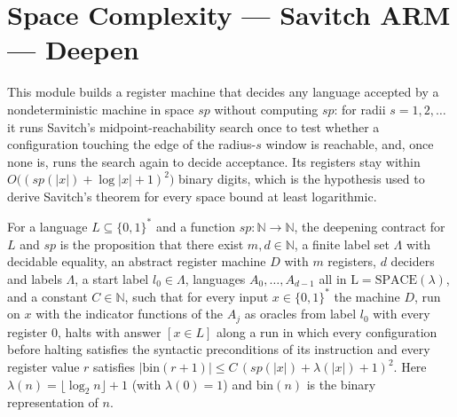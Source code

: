\section{Space Complexity --- Savitch ARM --- Deepen}
This module builds a register machine that decides any language accepted by a
nondeterministic machine in space $\mathit{sp}$ without computing $\mathit{sp}$: for radii
$s=1,2,\dots$ it runs Savitch's midpoint-reachability search once to test whether a configuration
touching the edge of the radius-$s$ window is reachable, and, once none is, runs the search again to
decide acceptance. Its registers stay within $O\bigl((\mathit{sp}(|x|)+\log|x|+1)^2\bigr)$ binary
digits, which is the hypothesis used to derive Savitch's theorem for every space bound at least
logarithmic.

\begin{definition}
\label{Complexity.LogProg.SavitchARM.DeepenContract}
\leanok
{}
For a language $L\subseteq\{0,1\}^*$ and a function $\mathit{sp}:\mathbb{N}\to\mathbb{N}$, the
deepening contract for $L$ and $\mathit{sp}$ is the proposition that there exist $m,d\in\mathbb{N}$,
a finite label set $\Lambda$ with decidable equality, an abstract register machine $D$ with $m$
registers, $d$ deciders and labels $\Lambda$, a start label $l_0\in\Lambda$, languages
$A_0,\dots,A_{d-1}$ all in $\mathrm{L}=\mathrm{SPACE}(\lambda)$, and a constant $C\in\mathbb{N}$, such that
for every input $x\in\{0,1\}^*$ the machine $D$, run on $x$ with the indicator functions of the
$A_j$ as oracles from label $l_0$ with every register $0$, halts with answer $[x\in L]$ along a run in
which every configuration before halting satisfies the syntactic preconditions of its instruction
and every register value $r$ satisfies
$|\mathrm{bin}(r+1)|\le C\,(\mathit{sp}(|x|)+\lambda(|x|)+1)^2$. Here
$\lambda(n)=\lfloor\log_2 n\rfloor+1$ (with $\lambda(0)=1$) and $\mathrm{bin}(n)$ is the binary
representation of $n$.
\end{definition}

